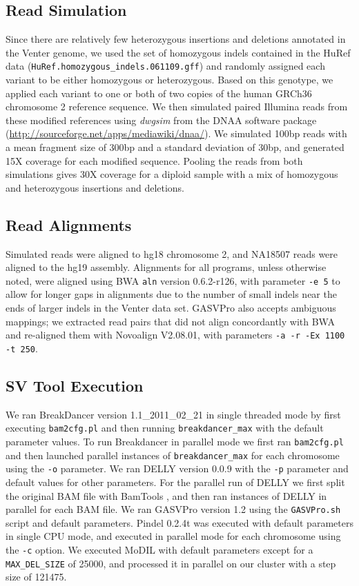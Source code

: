 \documentclass[10pt]{bmc_article}
\newenvironment{bmcformat}{\fussy\setboolean{publ}{true}}{\fussy}
\begin{document}
\begin{bmcformat}
\subsection*{Read Simulation}
Since there are relatively few heterozygous insertions and deletions annotated in the Venter genome, we used the set of homozygous indels contained in the HuRef data (\texttt{HuRef.homozygous\_indels.061109.gff}) and randomly assigned each variant to be either homozygous or heterozygous. Based on this genotype, we applied each variant to one or both of two copies of the human GRCh36 chromosome 2 reference sequence. We then simulated paired Illumina reads from these modified references using \emph{dwgsim} from the DNAA software package (\url{http://sourceforge.net/apps/mediawiki/dnaa/}). We simulated 100bp reads with a mean fragment size of 300bp and a standard deviation of 30bp, and generated 15X coverage for each modified sequence. Pooling the reads from both simulations gives 30X coverage for a diploid sample with a mix of homozygous and heterozygous insertions and deletions.

\subsection*{Read Alignments}
Simulated reads were aligned to hg18 chromosome 2, and NA18507 reads were aligned to the hg19 assembly. Alignments for all programs, unless otherwise noted, were aligned using BWA \texttt{aln} version 0.6.2-r126, with parameter \texttt{-e 5} to allow for longer gaps in alignments due to the number of small indels near the ends of larger indels in the Venter data set. GASVPro also accepts ambiguous mappings; we extracted read pairs that did not align concordantly with BWA and re-aligned them with Novoalign V2.08.01, with parameters \texttt{-a -r -Ex 1100 -t 250}. 

\subsection*{SV Tool Execution}
We ran BreakDancer version 1.1\_2011\_02\_21 in single threaded mode by first executing \texttt{bam2cfg.pl} and then running \texttt{breakdancer\_max} with the default parameter values.  To run Breakdancer in parallel mode we first ran \texttt{bam2cfg.pl} and then launched parallel instances of \texttt{breakdancer\_max} for each chromosome using the \texttt{-o} parameter. We ran DELLY version 0.0.9 with the \texttt{-p} parameter and default values for other parameters. For the parallel run of DELLY we first split the original BAM file with BamTools \cite{Barnett:2011hm}, and then ran instances of DELLY in parallel for each BAM file. We ran GASVPro version 1.2 using the \texttt{GASVPro.sh} script and default parameters. Pindel 0.2.4t was executed with default parameters in single CPU mode, and executed in parallel mode for each chromosome using the \texttt{-c} option. We executed MoDIL with default parameters except for a \texttt{MAX\_DEL\_SIZE} of 25000, and processed it in parallel on our cluster with a step size of 121475.


\end{bmcformat}
\end{document}
